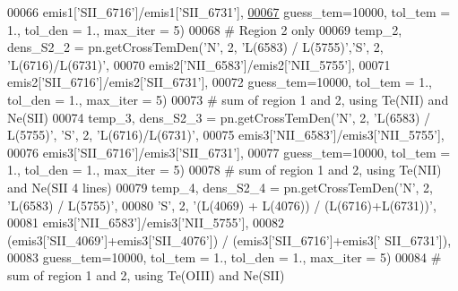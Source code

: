 \begin{DoxyCode}
00066                                       emis1[\textcolor{stringliteral}{'SII\_6716'}]/emis1[\textcolor{stringliteral}{'SII\_6731'}], 
\hypertarget{multi__comp_8py_source_l00067}{}\hyperlink{namespacepyneb_1_1test_1_1multi__comp_a727ee7c8e06d8c8f88ee5ca2989968a2}{00067}                                       guess\_tem=10000, tol\_tem = 1., tol\_den = 1., max\_iter = 5)
00068 \textcolor{comment}{# Region 2 only}
00069 temp\_2, dens\_S2\_2 = pn.getCrossTemDen(\textcolor{stringliteral}{'N'}, 2, \textcolor{stringliteral}{'L(6583) / L(5755)'},\textcolor{stringliteral}{'S'}, 2, \textcolor{stringliteral}{'L(6716)/L(6731)'}, 
00070                                       emis2[\textcolor{stringliteral}{'NII\_6583'}]/emis2[\textcolor{stringliteral}{'NII\_5755'}], 
00071                                       emis2[\textcolor{stringliteral}{'SII\_6716'}]/emis2[\textcolor{stringliteral}{'SII\_6731'}], 
00072                                       guess\_tem=10000, tol\_tem = 1., tol\_den = 1., max\_iter = 5)
00073 \textcolor{comment}{# sum of region 1 and 2, using Te(NII) and Ne(SII)}
00074 temp\_3, dens\_S2\_3 = pn.getCrossTemDen(\textcolor{stringliteral}{'N'}, 2, \textcolor{stringliteral}{'L(6583) / L(5755)'}, \textcolor{stringliteral}{'S'}, 2, \textcolor{stringliteral}{'L(6716)/L(6731)'}, 
00075                                       emis3[\textcolor{stringliteral}{'NII\_6583'}]/emis3[\textcolor{stringliteral}{'NII\_5755'}], 
00076                                       emis3[\textcolor{stringliteral}{'SII\_6716'}]/emis3[\textcolor{stringliteral}{'SII\_6731'}], 
00077                                       guess\_tem=10000, tol\_tem = 1., tol\_den = 1., max\_iter = 5)
00078 \textcolor{comment}{# sum of region 1 and 2, using Te(NII) and Ne(SII 4 lines)}
00079 temp\_4, dens\_S2\_4 = pn.getCrossTemDen(\textcolor{stringliteral}{'N'}, 2, \textcolor{stringliteral}{'L(6583) / L(5755)'},
00080                                       \textcolor{stringliteral}{'S'}, 2, \textcolor{stringliteral}{'(L(4069) + L(4076)) / (L(6716)+L(6731))'}, 
00081                                       emis3[\textcolor{stringliteral}{'NII\_6583'}]/emis3[\textcolor{stringliteral}{'NII\_5755'}],
00082                                       (emis3[\textcolor{stringliteral}{'SII\_4069'}]+emis3[\textcolor{stringliteral}{'SII\_4076'}]) / (emis3[\textcolor{stringliteral}{'SII\_6716'}]+emis3[\textcolor{stringliteral}{'
      SII\_6731'}]), 
00083                                       guess\_tem=10000, tol\_tem = 1., tol\_den = 1., max\_iter = 5)
00084 \textcolor{comment}{# sum of region 1 and 2, using Te(OIII) and Ne(SII)}

\end{DoxyCode}

